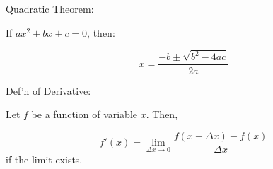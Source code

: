 \documentclass{article}
\begin{document}

Quadratic Theorem:

If $ax^2 + bx + c = 0$, then:

$$x = \frac{-b \pm \sqrt{b^2 - 4ac}}{2a}$$

Def'n of Derivative:

Let $f$ be a function of variable $x$.  Then,

$$f ' (x) = \lim_{\Delta x \to 0} \frac{f(x + \Delta x) - f(x)}{\Delta x}$$
if the limit exists.
\end{document}

